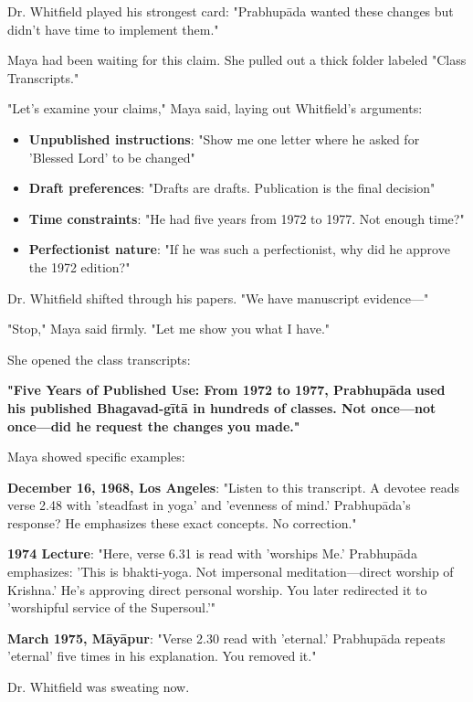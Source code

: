 \documentclass[12pt,twoside]{book}
\begin{document}
Dr. Whitfield played his strongest card: "Prabhupāda wanted these changes but didn't have time to implement them."

Maya had been waiting for this claim. She pulled out a thick folder labeled "Class Transcripts."

"Let's examine your claims," Maya said, laying out Whitfield's arguments:

\begin{itemize}
\item \textbf{\textbf{Unpublished instructions}}: "Show me one letter where he asked for 'Blessed Lord' to be changed"
\item \textbf{\textbf{Draft preferences}}: "Drafts are drafts. Publication is the final decision"
\item \textbf{\textbf{Time constraints}}: "He had five years from 1972 to 1977. Not enough time?"
\item \textbf{\textbf{Perfectionist nature}}: "If he was such a perfectionist, why did he approve the 1972 edition?"
\end{itemize}

Dr. Whitfield shifted through his papers. "We have manuscript evidence—"

"Stop," Maya said firmly. "Let me show you what I have."

She opened the class transcripts:

\textbf{\textbf{"Five Years of Published Use: From 1972 to 1977, Prabhupāda used his published Bhagavad-gītā in hundreds of classes. Not once—not once—did he request the changes you made."}}

Maya showed specific examples:

\textbf{\textbf{December 16, 1968, Los Angeles}}: "Listen to this transcript. A devotee reads verse 2.48 with 'steadfast in yoga' and 'evenness of mind.' Prabhupāda's response? He emphasizes these exact concepts. No correction."

\textbf{\textbf{1974 Lecture}}: "Here, verse 6.31 is read with 'worships Me.' Prabhupāda emphasizes: 'This is bhakti-yoga. Not impersonal meditation—direct worship of Krishna.' He's approving direct personal worship. You later redirected it to 'worshipful service of the Supersoul.'"

\textbf{\textbf{March 1975, Māyāpur}}: "Verse 2.30 read with 'eternal.' Prabhupāda repeats 'eternal' five times in his explanation. You removed it."

Dr. Whitfield was sweating now.
\end{document}
